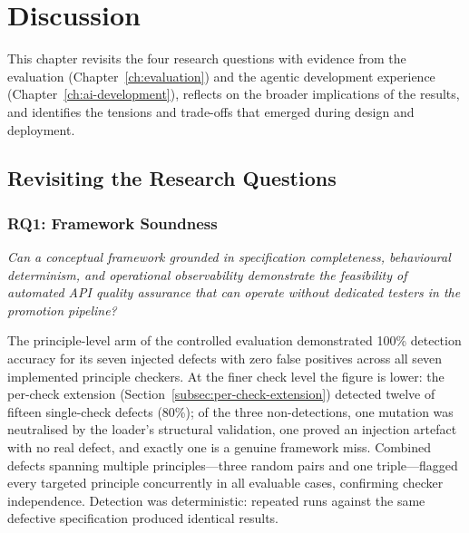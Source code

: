 \chapter{Discussion}
\label{ch:discussion}

This chapter revisits the four research questions with evidence from the evaluation (Chapter~\ref{ch:evaluation}) and the agentic development experience (Chapter~\ref{ch:ai-development}), reflects on the broader implications of the results, and identifies the tensions and trade-offs that emerged during design and deployment.

\section{Revisiting the Research Questions}
\label{sec:revisit-rqs}

\subsection{RQ1: Framework Soundness}
\label{subsec:discuss-rq1}

\textit{Can a conceptual framework grounded in specification completeness, behavioural determinism, and operational observability demonstrate the feasibility of automated API quality assurance that can operate without dedicated testers in the promotion pipeline?}

The principle-level arm of the controlled evaluation demonstrated 100\% detection accuracy for its seven injected defects with zero false positives across all seven implemented principle checkers. At the finer check level the figure is lower: the per-check extension (Section~\ref{subsec:per-check-extension}) detected twelve of fifteen single-check defects (80\%); of the three non-detections, one mutation was neutralised by the loader's structural validation, one proved an injection artefact with no real defect, and exactly one is a genuine framework miss. Combined defects spanning multiple principles---three random pairs and one triple---flagged every targeted principle concurrently in all evaluable cases, confirming checker independence. Detection was deterministic: repeated runs against the same defective specification produced identical results.

